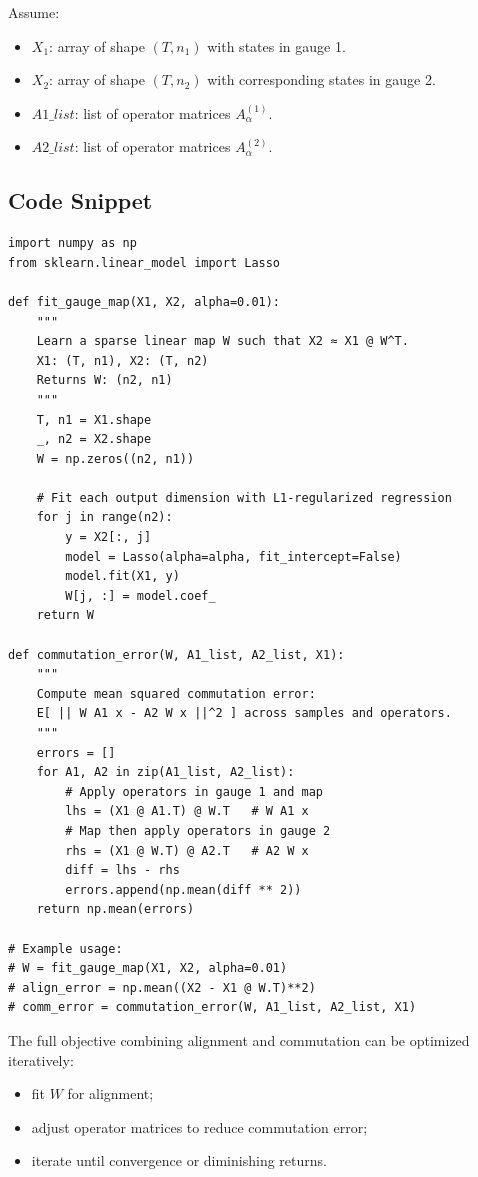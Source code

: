 \documentclass[11pt]{article}
\begin{document}
Assume:
\begin{itemize}[itemsep=3pt]
  \item $X_1$: array of shape $(T, n_1)$ with states in gauge 1.
  \item $X_2$: array of shape $(T, n_2)$ with corresponding states in gauge 2.
  \item $A1\_list$: list of operator matrices $A^{(1)}_\alpha$.
  \item $A2\_list$: list of operator matrices $A^{(2)}_\alpha$.
\end{itemize}

\subsection{Code Snippet}

\begin{verbatim}
import numpy as np
from sklearn.linear_model import Lasso

def fit_gauge_map(X1, X2, alpha=0.01):
    """
    Learn a sparse linear map W such that X2 ≈ X1 @ W^T.
    X1: (T, n1), X2: (T, n2)
    Returns W: (n2, n1)
    """
    T, n1 = X1.shape
    _, n2 = X2.shape
    W = np.zeros((n2, n1))

    # Fit each output dimension with L1-regularized regression
    for j in range(n2):
        y = X2[:, j]
        model = Lasso(alpha=alpha, fit_intercept=False)
        model.fit(X1, y)
        W[j, :] = model.coef_
    return W

def commutation_error(W, A1_list, A2_list, X1):
    """
    Compute mean squared commutation error:
    E[ || W A1 x - A2 W x ||^2 ] across samples and operators.
    """
    errors = []
    for A1, A2 in zip(A1_list, A2_list):
        # Apply operators in gauge 1 and map
        lhs = (X1 @ A1.T) @ W.T   # W A1 x
        # Map then apply operators in gauge 2
        rhs = (X1 @ W.T) @ A2.T   # A2 W x
        diff = lhs - rhs
        errors.append(np.mean(diff ** 2))
    return np.mean(errors)

# Example usage:
# W = fit_gauge_map(X1, X2, alpha=0.01)
# align_error = np.mean((X2 - X1 @ W.T)**2)
# comm_error = commutation_error(W, A1_list, A2_list, X1)
\end{verbatim}

The full objective combining alignment and commutation can be optimized iteratively:
\begin{itemize}[itemsep=3pt]
  \item fit $W$ for alignment;
  \item adjust operator matrices to reduce commutation error;
  \item iterate until convergence or diminishing returns.
\end{itemize}
\end{document}
